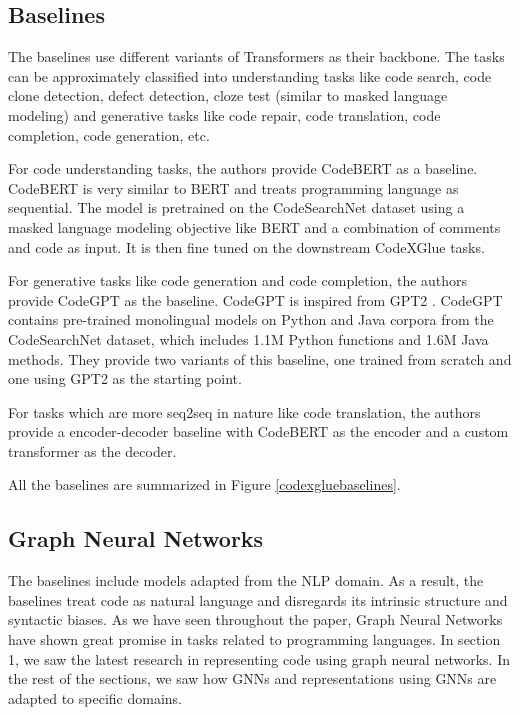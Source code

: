 \documentclass{article}
\begin{document}
\subsection{Baselines}
The baselines use different variants of Transformers as their backbone. The tasks can be approximately classified into understanding tasks like code search, code clone detection, defect detection, cloze test (similar to masked language modeling) and generative tasks like code repair, code translation, code completion, code generation, etc.

For code understanding tasks, the authors provide CodeBERT \cite{feng2020codebert} as a baseline. CodeBERT is very similar to BERT \cite{devlin2018bert} and treats programming language as sequential. The model is pretrained on the CodeSearchNet dataset \cite{husain2019codesearchnet} using a masked language modeling objective like BERT and a combination of comments and code as input. It is then fine tuned on the downstream CodeXGlue tasks.

For generative tasks like code generation and code completion, the authors provide CodeGPT as the baseline. CodeGPT is inspired from GPT2 \cite{radford2019better}. CodeGPT contains pre-trained monolingual models on Python and Java corpora from the CodeSearchNet dataset, which includes 1.1M Python functions and 1.6M Java methods. They provide two variants of this baseline, one trained from scratch and one using GPT2 as the starting point.

For tasks which are more seq2seq in nature like code translation, the authors provide a encoder-decoder baseline with CodeBERT as the encoder and a custom transformer as the decoder.

All the baselines are summarized in Figure \ref{codexgluebaselines}.

\subsection{Graph Neural Networks}
The baselines include models adapted from the NLP domain. As a result, the baselines treat code as natural language and disregards its intrinsic structure and syntactic biases. As we have seen throughout the paper, Graph Neural Networks have shown great promise in tasks related to programming languages. In section 1, we saw the latest research in representing code using graph neural networks. In the rest of the sections, we saw how GNNs and representations using GNNs are adapted to specific domains. 
\end{document}
